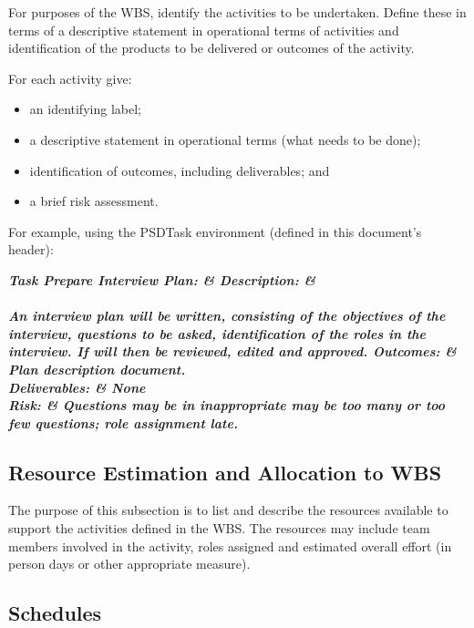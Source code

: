 \documentclass{l3deliverable}
\newenvironment{PSDTask}[2]{
  \tabularx{\linewidth}{|l|X|} \hline
    \bf\itshape Task #1: & \bf\itshape #2 \\\hline
}{\endtabularx}
\newcommand{\PSDTaskComponent}[2]{\it #1: & #2 \\ \hline}
\newcommand{\PSDTaskDescription}[1]{\PSDTaskComponent{Description}{#1}}
\newcommand{\PSDTaskOutcomes}[1]{\PSDTaskComponent{Outcomes}{#1}}
\newcommand{\PSDTaskDeliverables}[1]{\PSDTaskComponent{Deliverables}{#1}}
\newcommand{\PSDTaskRisks}[1]{\PSDTaskComponent{Risk}{#1}}
\begin{document}
For purposes of the WBS, identify the activities to be
undertaken. Define these in terms of a descriptive statement in
operational terms of activities and identification of the products to
be delivered or outcomes of the activity.

For each activity give: 

\begin{itemize}
\item an identifying label;
\item a descriptive statement in operational terms (what needs to be
  done);
\item identification of outcomes, including deliverables; and
\item a brief risk assessment.
\end{itemize}

For example, using the PSDTask environment (defined in this document's
header):

\begin{PSDTask}{4}{Prepare Interview Plan}
  \PSDTaskDescription{ An interview plan will be written, consisting
    of the objectives of the interview, questions to be asked,
    identification of the roles in the interview. If will then be
    reviewed, edited and approved.}%
  \PSDTaskOutcomes{Plan description document.}%
  \PSDTaskDeliverables{None}%
  \PSDTaskRisks{Questions may be in inappropriate may be too many or
    too few questions; role assignment late.}
\end{PSDTask}


\subsection{Resource Estimation and Allocation to WBS\label{sec:allocation}}


The purpose of this subsection is to list and describe the resources
available to support the activities defined in the WBS. The resources
may include team members involved in the activity, roles assigned and
estimated overall effort (in person days or other appropriate
measure).


\subsection{Schedules}
\end{document}

